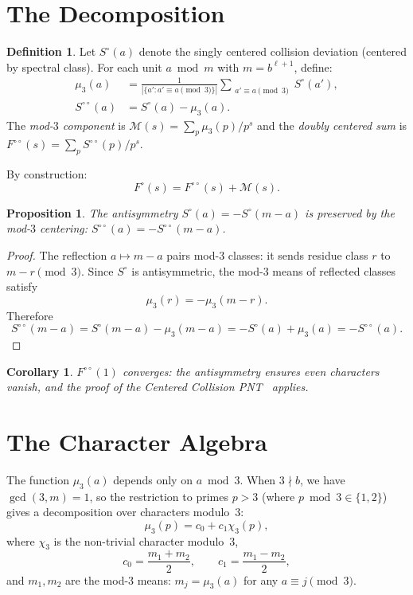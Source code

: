 \documentclass[12pt]{amsart}
\newtheorem{proposition}[theorem]{Proposition}
\newtheorem{corollary}[theorem]{Corollary}
\theoremstyle{definition}
\newtheorem{definition}[theorem]{Definition}
\theoremstyle{remark}
\begin{document}
\section{The Decomposition}

\begin{definition}
Let $S^{\circ}(a)$ denote the singly centered collision
deviation (centered by spectral class). For each unit
$a \bmod m$ with $m = b^{\ell+1}$, define:
\begin{align*}
\mu_3(a) &= \frac{1}{|\{a' : a' \equiv a \!\!\pmod{3}\}|}
\sum_{\substack{a' \equiv a \pmod{3}}}
S^{\circ}(a'), \\
S^{\circ\circ}(a) &= S^{\circ}(a) - \mu_3(a).
\end{align*}
The \emph{mod-$3$ component} is
$\mathcal{M}(s) = \sum_p \mu_3(p) / p^s$
and the \emph{doubly centered sum} is
$F^{\circ\circ}(s) = \sum_p S^{\circ\circ}(p) / p^s$.
\end{definition}

By construction:
\[
F^{\circ}(s) = F^{\circ\circ}(s) + \mathcal{M}(s).
\]

\begin{proposition}
The antisymmetry $S^{\circ}(a) = -S^{\circ}(m{-}a)$ is
preserved by the mod-$3$ centering: $S^{\circ\circ}(a)
= -S^{\circ\circ}(m{-}a)$.
\end{proposition}

\begin{proof}
The reflection $a \mapsto m - a$ pairs mod-$3$ classes:
it sends residue class $r$ to $m-r \pmod{3}$. Since
$S^{\circ}$ is antisymmetric, the mod-$3$ means of
reflected classes satisfy
\[
\mu_3(r) = -\mu_3(m-r).
\]
Therefore
\[
S^{\circ\circ}(m-a)
= S^{\circ}(m-a) - \mu_3(m-a)
= -S^{\circ}(a) + \mu_3(a)
= -S^{\circ\circ}(a).
\]
\end{proof}

\begin{corollary}
$F^{\circ\circ}(1)$ converges: the antisymmetry ensures
even characters vanish, and the proof of the Centered
Collision PNT~\cite{paper16} applies.
\end{corollary}

\section{The Character Algebra}

The function $\mu_3(a)$ depends only on $a \bmod 3$.
When $3 \nmid b$, we have $\gcd(3,m)=1$, so the
restriction to primes $p > 3$ (where
$p \bmod 3 \in \{1,2\}$) gives a decomposition over
characters modulo~$3$:
\[
\mu_3(p) = c_0 + c_1 \chi_3(p),
\]
where $\chi_3$ is the non-trivial character modulo~$3$,
\[
c_0 = \frac{m_1 + m_2}{2}, \qquad
c_1 = \frac{m_1 - m_2}{2},
\]
and $m_1, m_2$ are the mod-$3$ means:
$m_j = \mu_3(a)$ for any $a \equiv j \pmod{3}$.
\end{document}
